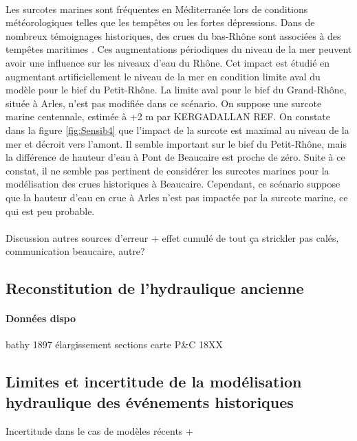 \documentclass[11pt]{article}
\begin{document}
	\paragraph{} Les surcotes marines sont fréquentes en Méditerranée lors de conditions météorologiques telles que les tempêtes ou les fortes dépressions. Dans de nombreux témoignages historiques, des crues du bas-Rhône sont associées à des tempêtes maritimes \citet{pichard_sept_2014}. Ces augmentations périodiques du niveau de la mer peuvent avoir une influence sur les niveaux d'eau du Rhône. Cet impact est étudié en augmentant artificiellement le niveau de la mer en condition limite aval du modèle pour le bief du Petit-Rhône. La limite aval pour le bief du Grand-Rhône, située à Arles, n'est pas modifiée dans ce scénario. On suppose une surcote marine centennale, estimée à +2 m par KERGADALLAN REF. On constate dans la figure \ref{fig:Sensib4} que l'impact de la surcote est maximal au niveau de la mer et décroit vers l'amont. Il semble important sur le bief du Petit-Rhône, mais la différence de hauteur d'eau à Pont de Beaucaire est proche de zéro. Suite à ce constat, il ne semble pas pertinent de considérer les surcotes marines pour la modélisation des crues historiques à Beaucaire. Cependant, ce scénario suppose que la hauteur d'eau en crue à Arles n'est pas impactée par la surcote marine, ce qui est peu probable.
	
	\paragraph{} Discussion autres sources d'erreur + effet cumulé de tout ça
strickler pas calés, communication beaucaire, autre?
		
	\subsection{Reconstitution de l'hydraulique ancienne}
	
	
	
	\paragraph{Données dispo}
	bathy 1897
	élargissement sections
	carte P\&C 18XX
	
	
		
	\subsection{Limites et incertitude de la modélisation hydraulique des événements historiques}
Incertitude dans le cas de modèles récents +	
	
\end{document}
